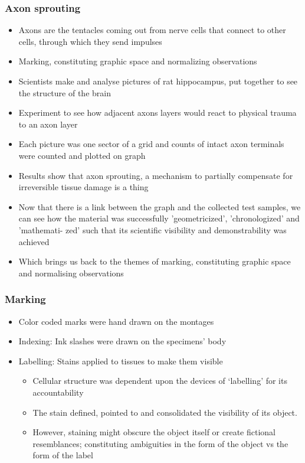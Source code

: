 \documentclass[a4paper]{article}
\begin{document}
\subsubsection{Axon sprouting}
\begin{itemize}
	\item Axons are the tentacles coming out from nerve cells that connect to other cells, through which they send impulses
	\item Marking, constituting graphic space and normalizing observations
	\item Scientists make and analyse pictures of rat hippocampus, put together to see the structure of the brain
	\item Experiment to see how adjacent axons layers would react to physical trauma to an axon layer
	\item Each picture was one sector of a grid and counts of intact axon terminals were counted and plotted on graph
	\item Results show that axon sprouting, a mechanism to partially compensate for irreversible tissue damage is a thing
	\item Now that there is a link between the graph and the collected test samples, we can see how the material was successfully 'geometricized', 'chronologized' and 'mathemati- zed' such that its scientific visibility and demonstrability was achieved
	\item Which brings us back to the themes of marking, constituting graphic space and normalising observations
\end{itemize}

\subsubsection{Marking}
\begin{itemize}
	\item Color coded marks were hand drawn on the montages 
	\item Indexing: Ink slashes were drawn on the specimens’ body 
	\item Labelling: Stains applied to tissues to make them visible 
	\begin{itemize}[label=$\circ$]
		\item Cellular structure was dependent upon the devices of ‘labelling’ for its accountability
		\item The stain defined, pointed to and consolidated the visibility of its object.
		\item However, staining might obscure the object itself or create fictional resemblances; constituting ambiguities in the form of the object vs the form of the label
	\end{itemize}
\end{itemize}
\end{document}
